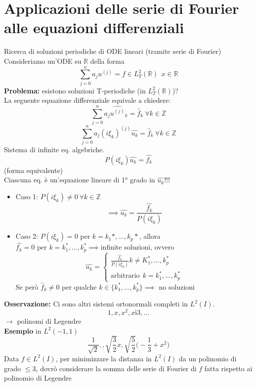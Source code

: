 \documentclass[a4paper]{article}
\newcommand{\R}{\mathbb{R}}
\newcommand{\Z}{\mathbb{Z}}
\begin{document}
\section{Applicazioni delle serie di Fourier alle equazioni differenziali}
Ricerca di soluzioni periodiche di ODE lineari (tramite serie di Fourier)
\\Consideriamo un'ODE su $\R$ della forma
\[\sum_{j=0}^{n} a_ju^{(j)}=f\in L^{2}_T(\R)\ \ x\in \R\]
\textbf{Problema:} esistono soluzioni T-periodiche (in $L^{2}_T(\R)$)?
\\La seguente equazione differenziale equivale a chiedere:
\[\sum_{j=0}^{n} a_j\hat{u^{(j)}}_k=\hat{f}_k\ \forall k\in \Z\]
\[\sum_{j=0}^{n} a_j(i\xi_k)^{(j)}\hat{u_k}=\hat{f}_k\ \forall k\in \Z\]
Sistema di infinite eq. algebriche.
\[P(i\xi_k)\hat{u_k}=\hat{f_k}\]
(forma equivalente)
\\Ciascuna eq. è un'equazione lineare di 1° grado in $\hat{u_k}$!!!
\begin{itemize}
	\item Caso 1: $P(i\xi_k)\neq 0\ \forall k\in \Z$ 
		\[\implies \hat{u_k}=\frac{\hat{f_k}}{P(i\xi_k)}\]
	\item Caso 2: $P(i\xi_k)=0$ per $k=k_1*,\ldots,k_p*$, allora
		\\$\hat{f_k}=0$ per $k=k_1^*,\ldots,k_p^*\implies $infinite soluzioni, ovvero
		\[\hat{u_k}=\begin{cases}
		\frac{\hat{f_k}}{P(i\xi_k)} k\neq K_1^*,\ldots,k_p^*
	\\\text{arbitrario}\ \ k=k_1^*,\ldots,k_p^*

\end{cases}\]
Se però $\hat{f}_k\neq 0$ per qualche $k\in \{k_1^*,\ldots,k^*_p\} \implies $ no soluzioni
\end{itemize}
\textbf{Osservazione:} Ci sono altri sistemi ortonormali completi in $L^{2}(I)$.
\[1,x,x^2,xì3,\ldots\]
$\to $ polinomi di Legendre\\
\textbf{Esempio} in $L^2(-1,1)$ 
\[\frac{1}{\sqrt{2} },, \sqrt{\frac{3}{2}} x, \sqrt{\frac{5}{2}} \bigg(-\frac{1}{3}+x^2\bigg)\]
Data $f\in L^{2}(I)$, per minimizzare la distanza in $L^{2}(I)$ da un polinomio di grado $\le 3$, dovrò considerare la somma delle serie di Fourier di  $f$ fatta rispetto ai polinomio di Legendre
\end{document}
